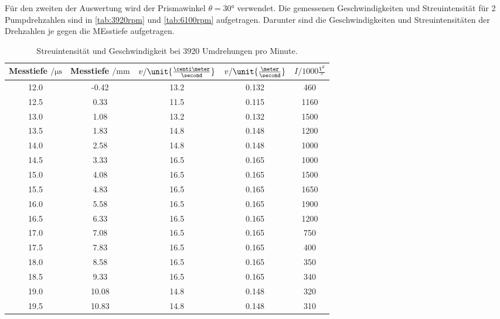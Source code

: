 Für den zweiten der Auswertung wird der Prismawinkel $\theta =30°$ verwendet. Die gemessenen Geschwindigkeiten und Streuintensität für 2 Pumpdrehzahlen sind in \autoref{tab:3920rpm} und \autoref{tab:6100rpm} aufgetragen.
Darunter sind die Geschwindigkeiten und Streuintensitäten der Drehzahlen je gegen die MEsstiefe aufgetragen.
 \begin{table}
     \centering
     \caption{Streuintensität und Geschwindigkeit bei 3920 Umdrehungen pro Minute.}
     \begin{tabular}{c c c c c}
         \toprule
         Messtiefe $ \mathrm{/} \unit{\micro \second}$ &  Messtiefe $ \mathrm{/} \unit{\milli \meter}$ & $v \mathrm{/} \unit{\frac{\centi \meter}{\second}}$ & $v \mathrm{/} \unit{\frac{\meter}{\second}}$ & $I \mathrm{/} 1000\unit{\frac{V^2}{\second}}$\\
         \midrule
         12.0 &  -0.42 &  13.2 &  0.132 &  460\\
         12.5 &  0.33 &  11.5 &  0.115 &  1160\\
         13.0 &  1.08 &  13.2 &  0.132 &  1500\\
         13.5 &  1.83 &  14.8 &  0.148 &  1200\\
         14.0 &  2.58 &  14.8 &  0.148 &  1000\\
         14.5 &  3.33 &  16.5 &  0.165 &  1000\\
         15.0 &  4.08 &  16.5 &  0.165 &  1500\\
         15.5 &  4.83 &  16.5 &  0.165 &  1650\\
         16.0 &  5.58 &  16.5 &  0.165 &  1900\\
         16.5 &  6.33 &  16.5 &  0.165 &  1200\\
         17.0 &  7.08 &  16.5 &  0.165 &  750\\
         17.5 &  7.83 &  16.5 &  0.165 &  400\\
         18.0 &  8.58 &  16.5 &  0.165 &  350\\
         18.5 &  9.33 &  16.5 &  0.165 &  340\\
         19.0 &  10.08 &  14.8 &  0.148 &  320\\
         19.5 &  10.83 &  14.8 &  0.148 &  310\\
         \bottomrule
     \end{tabular}
     \label{tab:3920rpm}
\end{table}
